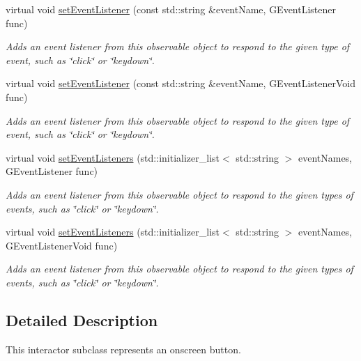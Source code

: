 \begin{DoxyCompactItemize}
virtual void \mbox{\hyperlink{classGObservable_ad2f6d34961c50f6c1e0659990b79f741}{set\+Event\+Listener}} (const std\+::string \&event\+Name, G\+Event\+Listener func)
\begin{DoxyCompactList}\small\item\em Adds an event listener from this observable object to respond to the given type of event, such as \char`\"{}click\char`\"{} or \char`\"{}keydown\char`\"{}. \end{DoxyCompactList}\item 
virtual void \mbox{\hyperlink{classGObservable_abac4cb9f9e626e010e87f5d91573c8a5}{set\+Event\+Listener}} (const std\+::string \&event\+Name, G\+Event\+Listener\+Void func)
\begin{DoxyCompactList}\small\item\em Adds an event listener from this observable object to respond to the given type of event, such as \char`\"{}click\char`\"{} or \char`\"{}keydown\char`\"{}. \end{DoxyCompactList}\item 
virtual void \mbox{\hyperlink{classGObservable_afa388d69c33c718cf035774604065604}{set\+Event\+Listeners}} (std\+::initializer\+\_\+list$<$ std\+::string $>$ event\+Names, G\+Event\+Listener func)
\begin{DoxyCompactList}\small\item\em Adds an event listener from this observable object to respond to the given types of events, such as \char`\"{}click\char`\"{} or \char`\"{}keydown\char`\"{}. \end{DoxyCompactList}\item 
virtual void \mbox{\hyperlink{classGObservable_a7867184bbb686f74fae8a4db927da799}{set\+Event\+Listeners}} (std\+::initializer\+\_\+list$<$ std\+::string $>$ event\+Names, G\+Event\+Listener\+Void func)
\begin{DoxyCompactList}\small\item\em Adds an event listener from this observable object to respond to the given types of events, such as \char`\"{}click\char`\"{} or \char`\"{}keydown\char`\"{}. \end{DoxyCompactList}\end{DoxyCompactItemize}


\subsection{Detailed Description}
This interactor subclass represents an onscreen button. 


